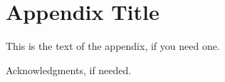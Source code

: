 \documentclass[preprint,10pt,nocopyrightspace,nonatbib]{./bibs/sigplanconf}
\begin{document}

\note{}


\appendix
\section{Appendix Title}

This is the text of the appendix, if you need one.

\acks

Acknowledgments, if needed.

% 




\end{document}
